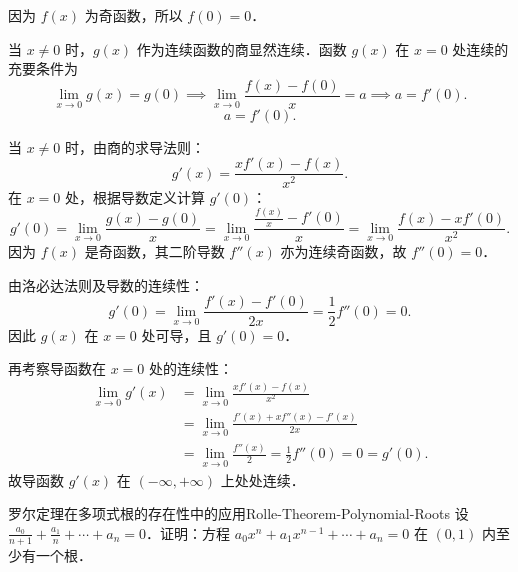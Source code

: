 \begin{solution}

    因为 $f(x)$ 为奇函数，所以 $f(0) = 0$．

    当 $x \neq 0$ 时，$g(x)$ 作为连续函数的商显然连续．函数 $g(x)$ 在 $x = 0$ 处连续的充要条件为
    \begin{equation}
        \lim_{x\to 0} g(x) = g(0) \implies \lim_{x\to 0} \frac{f(x) - f(0)}{x} = a \implies a = f'(0).
    \end{equation}
    \begin{equation}
        \boxed{a = f'(0).}
    \end{equation}


    当 $x \neq 0$ 时，由商的求导法则：
    \begin{equation}
        g'(x) = \frac{x f'(x) - f(x)}{x^2}.
    \end{equation}
    在 $x = 0$ 处，根据导数定义计算 $g'(0)$：
    \begin{equation}
        g'(0) = \lim_{x\to 0} \frac{g(x) - g(0)}{x} = \lim_{x\to 0} \frac{\frac{f(x)}{x} - f'(0)}{x} = \lim_{x\to 0} \frac{f(x) - x f'(0)}{x^2}.
    \end{equation}
    因为 $f(x)$ 是奇函数，其二阶导数 $f''(x)$ 亦为连续奇函数，故 $f''(0) = 0$．

    由洛必达法则及导数的连续性：
    \begin{equation}
        g'(0) = \lim_{x\to 0} \frac{f'(x) - f'(0)}{2x} = \frac{1}{2} f''(0) = 0.
    \end{equation}
    因此 $g(x)$ 在 $x = 0$ 处可导，且 $g'(0) = 0$．

    再考察导函数在 $x = 0$ 处的连续性：
    \begin{equation}
        \begin{aligned}
            \lim_{x\to 0} g'(x) & = \lim_{x\to 0} \frac{x f'(x) - f(x)}{x^2}                         \\
                                & = \lim_{x\to 0} \frac{f'(x) + x f''(x) - f'(x)}{2x}                \\
                                & = \lim_{x\to 0} \frac{f''(x)}{2} = \frac{1}{2} f''(0) = 0 = g'(0).
        \end{aligned}
    \end{equation}
    故导函数 $g'(x)$ 在 $(-\infty, +\infty)$ 上处处连续．
\end{solution}

\begin{problem}{罗尔定理在多项式根的存在性中的应用}{Rolle-Theorem-Polynomial-Roots}
    设 $\frac{a_0}{n+1} + \frac{a_1}{n} + \cdots + a_n = 0$．证明：方程 $a_0 x^n + a_1 x^{n-1} + \cdots + a_n = 0$ 在 $(0, 1)$ 内至少有一个根．
\end{problem}

